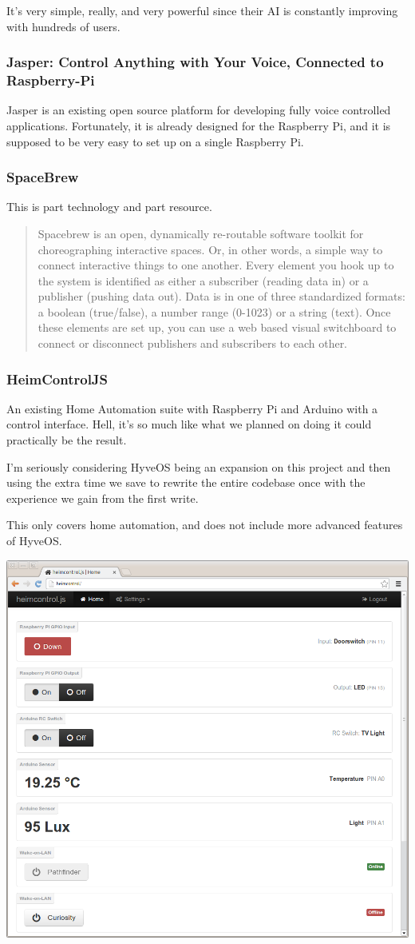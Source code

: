 \begin{multicols}{2}
			It's very simple, really, and very powerful since their AI is constantly improving with hundreds of users.
		
		\subsubsection{Jasper: Control Anything with Your Voice, Connected to Raspberry-Pi}
		
			Jasper is an existing open source platform for developing fully voice controlled applications.
			Fortunately, it is already designed for the Raspberry Pi, and it is supposed to be very easy to set up on a single Raspberry Pi.
			
		\subsubsection{SpaceBrew}
		
			This is part technology and part resource.
			
			\begin{quote}
				Spacebrew is an open, dynamically re-routable software toolkit for choreographing interactive spaces. Or, in other words, a simple way to connect interactive things to one another. Every element you hook up to the system is identified as either a subscriber (reading data in) or a publisher (pushing data out). Data is in one of three standardized formats: a boolean (true/false), a number range (0-1023) or a string (text). Once these elements are set up, you can use a web based visual switchboard to connect or disconnect publishers and subscribers to each other.
			\end{quote}
			
		\subsubsection{HeimControlJS}
		
			An existing Home Automation suite with Raspberry Pi and Arduino with a control interface.
			Hell, it's so much like what we planned on doing it could practically be the result.
			
			I'm seriously considering HyveOS being an expansion on this project and then using the extra time we save to rewrite the entire codebase once with the experience we gain from the first write.
			
			This only covers home automation, and does not include more advanced features of HyveOS.
			
			\includegraphics[width=.5\textwidth]{gfx/heimcontrol.png}
		

\end{multicols}
